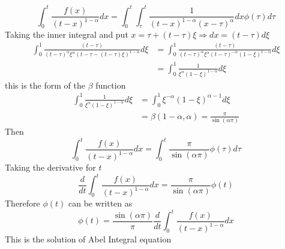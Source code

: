 \documentclass[]{article}
\begin{document}
\begin{center}
\end{center}
\[
\int_{0}^{t} \frac{f(x)}{{(t-x)}^{1-\alpha}} dx= \int_{0}^{t}\int_{\tau}^{t} \frac{1}{{(t-x)}^{1-\alpha}{(x-\tau)}^\alpha} dx \phi(\tau) d\tau
\]
Taking the inner integral and put $x = \tau + (t-\tau)\xi \Longrightarrow dx = (t-\tau)d\xi$
\begin{align*}
    \int_{0}^{1} \frac{(t-\tau)}{{(t-\tau)}^\alpha \xi^{\alpha} {(t-\tau-(t-\tau)\xi)}^{1-\alpha}} d\xi 
    &= \int_{0}^{1} \frac{(t-\tau)}{{(t-\tau)}^\alpha \xi^\alpha {(t-\tau)}^{-\alpha}{(1-\xi)}^{1-\alpha}} d\xi
    \\
    &= \int_{0}^{1} \frac{1}{\xi^{\alpha} {(1-\xi)}^{1-\alpha} } d\xi
\end{align*}
this is the form of the $\beta$ function
\begin{align*}
    \int_{0}^{1} \frac{1}{\xi^{\alpha} {(1-\xi)}^{1-\alpha} } d\xi &= \int_{0}^{1} \xi^{-\alpha} {(1-\xi)}^{\alpha-1} d\xi
    \\
    &=\beta (1-\alpha,\alpha) = \frac{\pi}{\sin(\alpha\pi)}
\end{align*}
Then
\[
\int_{0}^{t} \frac{f(x)}{{(t-x)}^{1-\alpha}} dx = \int_{0}^{t} \frac{\pi}{\sin(\alpha\pi)} \phi(\tau) d\tau
\]
Taking the derivative for $t$ 
\[
\frac{d}{dt} \int_{0}^{t} \frac{f(x)}{{(t-x)}^{1-\alpha}} dx = \frac{\pi}{\sin(\alpha\pi)} \phi(t)
\]
Therefore $\phi(t)$ can be written as 
\[
\phi(t) = \frac{\sin(\alpha\pi)}{\pi}  \frac{d}{dt} \int_{0}^{t} \frac{f(x)}{{(t-x)}^{1-\alpha}} dx
\]
This is the solution of Abel Integral equation
\end{document}
